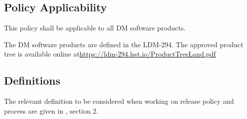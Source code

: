 \subsection{Policy Applicability} \label{sec:applicability}

This policy shall be applicable to all \gls{DM} software products.

The \gls{DM} software products are defined in the LDM-294.
The approved product tree is available online at\url{https://ldm-294.lsst.io/ProductTreeLand.pdf}


\subsection{Definitions} \label{sec:defs}

The relevant definition to be considered when working on release policy and process are given in , section 2.

